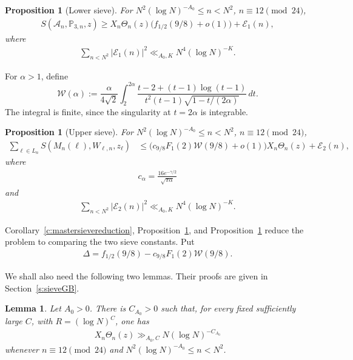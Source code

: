 \documentclass[12pt,reqno]{amsart}
\numberwithin{equation}{section}
\newtheorem{lemma}[equation]{Lemma}
\newtheorem{proposition}[equation]{Proposition}
\theoremstyle{definition}
\theoremstyle{remark}
\begin{document}
\begin{proposition}[Lower sieve]\label{p:sieveneedlower8}
For $N^2(\log N)^{-A_0}\leq n<N^2$, $n\equiv12\pmod{24}$,
\begin{align}\label{e:sieveneedlower8}
 S(\mathcal A_n,\mathbb P_{3,n},z)
 \geq X_n\Theta_n(z)\bigl(f_{1/2}(9/8)+o(1)\bigr)
 +\mathcal E_1(n),
\end{align}
where
\begin{align}\label{e:E1section8}
\sum_{n<N^2}|\mathcal E_1(n)|^2
\ll_{A_0,K} N^4(\log N)^{-K}.
\end{align}
\end{proposition}
For \(\alpha>1\), define
\begin{equation}\label{e:Wdef8}
 \mathcal W(\alpha)
 :=
 \frac{\alpha}{4\sqrt2}
 \int_2^{2\alpha}
 \frac{t-2+(t-1)\log(t-1)}
      {t^2(t-1)\sqrt{1-t/(2\alpha)}}\,dt .
\end{equation}
The integral is finite, since the singularity at \(t=2\alpha\) is integrable.
\begin{proposition}[Upper sieve]\label{p:sieveneedupper8}
For $N^2(\log N)^{-A_0}\leq n<N^2$, $n\equiv12\pmod{24}$,
\begin{align}\label{e:sieveneedupper8}
 \sum_{\ell\in L_n}S(M_n(\ell),W_{\ell,n},z_\ell)
 &\leq
 \bigl(c_{9/8}F_1(2)\mathcal W(9/8)+o(1)\bigr)
 X_n\Theta_n(z)+\mathcal E_2(n),
\end{align}
where
\begin{align}\label{e:calphadef8}
 c_\alpha=\frac{16e^{-\gamma/2}}{\sqrt{\pi\alpha}}
\end{align}
and
\begin{align}\label{e:E2section8}
\sum_{n<N^2}|\mathcal E_2(n)|^2
\ll_{A_0,K} N^4(\log N)^{-K}.
\end{align}
\end{proposition}


Corollary~\ref{c:mastersievereduction}, Proposition~\ref{p:sieveneedlower8}, and Proposition~\ref{p:sieveneedupper8} reduce the problem to comparing the two
sieve constants. Put
\begin{align}\label{e:Deltadef}
 \Delta
 =f_{1/2}(9/8)-c_{9/8}F_1(2)\mathcal W(9/8).
\end{align}

We shall also need the following two lemmas.  Their proofs are given in
Section~\ref{s:sieveGB}.
\begin{lemma}\label{l:maintermsize8}
Let \(A_0>0\).  There is \(C_{A_0}>0\) such that, for every fixed
sufficiently large \(C\), with \(R=(\log N)^C\), one has
\begin{align}\label{e:maintermlower8}
 X_n\Theta_n(z)\gg_{A_0,C}
 N(\log N)^{-C_{A_0}}
\end{align}
whenever $n\equiv12\pmod{24}$ and $N^2(\log N)^{-A_0}\leq n<N^2$.
\end{lemma}
\end{document}
